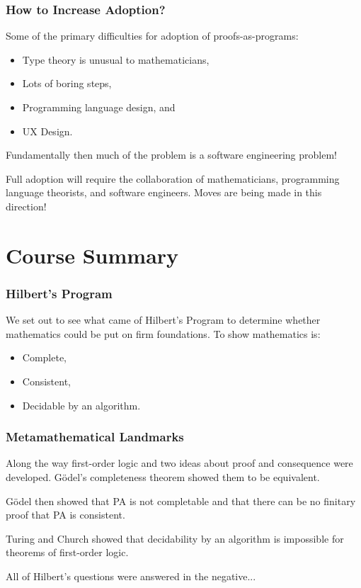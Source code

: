 \documentclass{beamer}
\theoremstyle{indentDefn} \newtheorem{defn}[]{Definition}
\begin{document}
\begin{frame}
  \frametitle{How to Increase Adoption?}

  Some of the primary difficulties for adoption of proofs-as-programs:

  \begin{itemize}
    \item Type theory is unusual to mathematicians, 
    \item Lots of boring steps,
    \item Programming language design, and 
    \item UX Design.
  \end{itemize}

  Fundamentally then much of the problem is a software engineering problem! 

  Full adoption will require the collaboration of mathematicians, programming language theorists, and software engineers. Moves are being made in this direction!


\end{frame}

\section{Course Summary}

\begin{frame}
  \frametitle{Hilbert's Program}

  We set out to see what came of Hilbert's Program to determine whether mathematics could be put on firm foundations. To show mathematics is: 

  \begin{itemize}
    \item Complete,
    \item Consistent, 
    \item Decidable by an algorithm. 
  \end{itemize}
\end{frame}

\begin{frame}
  \frametitle{Metamathematical Landmarks}

  Along the way first-order logic and two ideas about proof and consequence were developed. G\"{o}del's completeness theorem showed them to be equivalent. 

  G\"{o}del then showed that PA is not completable and that there can be no finitary proof that PA is consistent. 

  Turing and Church showed that decidability by an algorithm is impossible for theorems of first-order logic. 

  All of Hilbert's questions were answered in the negative... 
\end{frame}
\end{document}
